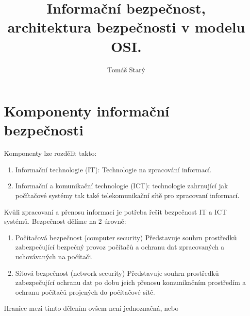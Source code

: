 \documentclass{szzclass}
\title{Informační bezpečnost, architektura bezpečnosti v modelu OSI.}
\author{Tomáš Starý}
\begin{document}
\section{Komponenty informační bezpečnosti}

Komponenty lze rozdělit takto:
\begin{enumerate}
    \item Informační technologie (IT): Technologie na zpracování informací.
    \item Informační a komunikační technologie (ICT): technologie zahrnující jak počítačové systémy
    tak také telekomunikační sítě pro zpracovaní informací.
\end{enumerate}

Kvůli zpracovaní a přenosu informací je potřeba řešit bezpečnost IT a ICT systémů. Bezpečnost dělíme na 2 úrovně:
\begin{enumerate}
    \item Počítačová bezpečnost (computer security)
          Představuje souhrn prostředků zabezpečující bezpečný provoz počítačů a ochranu dat
          zpracovaných a uchovávaných na počítači.
    \item Síťová bezpečnost (network security)
          Představuje souhrn prostředků zabezpečující ochranu dat po dobu jeich přenosu komunikačním
          prostředím a ochranu počítačů projených do počítačové sítě.
\end{enumerate}

Hranice mezi tímto dělením ovšem není jednoznačná, nebo
\end{document}
